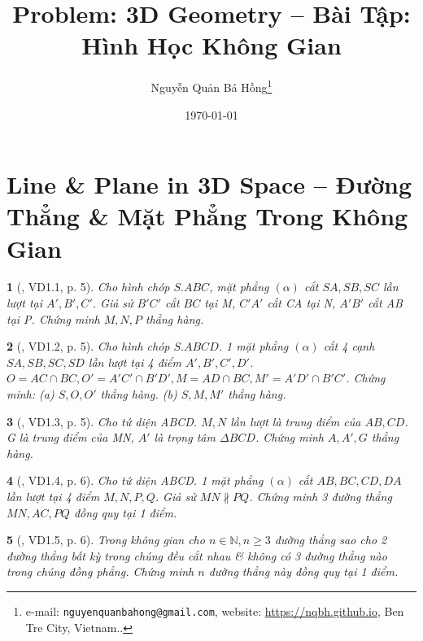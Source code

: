 \documentclass{article}
\title{Problem: 3D Geometry -- Bài Tập: Hình Học Không Gian}
\author{Nguyễn Quản Bá Hồng\footnote{e-mail: \texttt{nguyenquanbahong@gmail.com}, website: \url{https://nqbh.github.io}, Ben Tre City, Vietnam..}}
\date{\today}
\newtheorem{baitoan}{}
\begin{document}
\maketitle
\tableofcontents


\section{Line \& Plane in 3D Space -- Đường Thẳng \& Mặt Phẳng Trong Không Gian}

\begin{baitoan}[\cite{BTNC_Toan_11_HH}, VD1.1, p. 5]
	Cho hình chóp $S.ABC$, mặt phẳng $(\alpha)$ cắt $SA,SB,SC$ lần lượt tại $A',B',C'$. Giả sử $B'C'$ cắt $BC$ tại M, $C'A'$ cắt CA tại N, $A'B'$ cắt AB tại P. Chứng minh $M,N,P$ thẳng hàng.
\end{baitoan}

\begin{baitoan}[\cite{BTNC_Toan_11_HH}, VD1.2, p. 5]
	Cho hình chóp $S.ABCD$. 1 mặt phẳng $(\alpha)$ cắt 4 cạnh $SA,SB,SC,SD$ lần lượt tại 4 điểm $A',B',C',D'$. $O = AC\cap BC,O' = A'C'\cap B'D',M = AD\cap BC,M' = A'D'\cap B'C'$. Chứng minh: (a) $S,O,O'$ thẳng hàng. (b) $S,M,M'$ thẳng hàng.
\end{baitoan}

\begin{baitoan}[\cite{BTNC_Toan_11_HH}, VD1.3, p. 5]
	Cho tứ diện ABCD. $M,N$ lần lượt là trung điểm của $AB,CD$. G là trung điểm của MN, $A'$ là trọng tâm $\Delta BCD$. Chứng minh $A,A',G$ thẳng hàng.
\end{baitoan}

\begin{baitoan}[\cite{BTNC_Toan_11_HH}, VD1.4, p. 6]
	Cho tứ diện ABCD. 1 mặt phẳng $(\alpha)$ cắt $AB,BC,CD,DA$ lần lượt tại 4 điểm $M,N,P,Q$. Giả sử $MN\nparallel PQ$. Chứng minh 3 đường thẳng $MN,AC,PQ$ đồng quy tại 1 điểm.
\end{baitoan}

\begin{baitoan}[\cite{BTNC_Toan_11_HH}, VD1.5, p. 6]
	Trong không gian cho $n\in\mathbb{N},n\ge3$ đường thẳng sao cho 2 đường thẳng bất kỳ trong chúng đều cắt nhau \& không có 3 đường thẳng nào trong chúng đồng phẳng. Chứng minh $n$ đường thẳng này đồng quy tại 1 điểm.
\end{baitoan}

\end{document}
